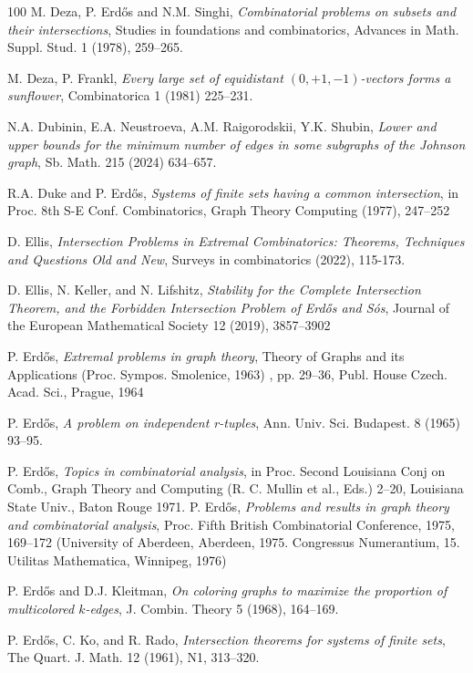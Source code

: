 \documentclass[graybox]{svmult}
\begin{document}
\begin{thebibliography}{100}
 M. Deza, P. Erd\H os and N.M. Singhi, {\it Combinatorial problems on subsets and their intersections}, Studies in foundations and combinatorics, Advances in Math. Suppl. Stud. 1 (1978), 259--265.

 M. Deza, P. Frankl, {\it Every large set of equidistant $(0,+ 1,-1)$-vectors forms a sunflower}, Combinatorica 1 (1981) 225--231.

 N.A. Dubinin, E.A. Neustroeva, A.M. Raigorodskii, Y.K. Shubin, {\it Lower and upper bounds for the minimum number of edges in some subgraphs of the Johnson graph}, Sb. Math. 215 (2024) 634--657.


 R.A. Duke and P. Erd\H os, {\it Systems of finite sets having a common intersection}, in Proc. 8th S-E Conf. Combinatorics, Graph Theory Computing (1977), 247--252

 D. Ellis, {\it Intersection Problems in Extremal Combinatorics: Theorems, Techniques and Questions Old and New}, Surveys in combinatorics (2022), 115-173.

 D. Ellis, N. Keller, and N. Lifshitz, {\it Stability for the Complete Intersection Theorem, and the Forbidden Intersection Problem of Erd\H{o}s and S\'os}, Journal of the European Mathematical Society 12 (2019), 3857--3902

 P. Erd\H os, {\it Extremal problems in graph theory}, Theory of Graphs and its Applications (Proc. Sympos. Smolenice, 1963) , pp. 29--36, Publ. House Czech. Acad. Sci., Prague, 1964


 P. Erd\H os, \textit{A problem on independent r-tuples}, Ann. Univ. Sci. Budapest. 8 (1965) 93--95.

 P. Erd\H os, {\it Topics in combinatorial analysis}, in Proc. Second Louisiana Conj on Comb., Graph Theory and Computing (R. C. Mullin et al., Eds.) 2--20, Louisiana State Univ., Baton Rouge 1971.
 P. Erd\H os, {\it Problems and results in graph theory and combinatorial analysis}, Proc. Fifth British Combinatorial Conference, 1975, 169--172 (University of Aberdeen, Aberdeen, 1975. Congressus Numerantium, 15. Utilitas Mathematica, Winnipeg, 1976)

 P. Erd\H os and D.J. Kleitman, {\it On coloring graphs to maximize the proportion of multicolored $k$-edges}, J. Combin. Theory 5 (1968), 164--169.

 P. Erd\H os, C. Ko, and R. Rado, \textit{Intersection theorems for systems of finite sets}, The Quart. J. Math. 12 (1961), N1, 313--320.


\end{thebibliography}
\end{document}
